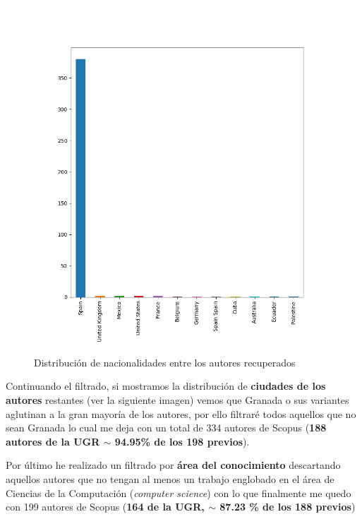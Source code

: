 \begin{figure}[h!]
	
	\centering
	\includegraphics[width=0.9\linewidth]{imagenes/country_hist}
	\caption{Distribución de nacionalidades entre los autores recuperados}
\end{figure}

Continuando el filtrado, si mostramos la distribución de \textbf{ciudades de los autores} restantes (ver la siguiente imagen) vemos que Granada o sus variantes aglutinan a la gran mayoría de los autores, por ello filtraré todos aquellos que no sean Granada lo cual me deja con un total de 334 autores de Scopus (\textbf{188 autores de la \acrshort{UGR} $\sim$ 94.95\% de los 198 previos}).

Por último he realizado un filtrado por \textbf{área del conocimiento} descartando aquellos autores que no tengan al menos un trabajo englobado en el área de Ciencias de la Computación (\textit{computer science}) con lo que finalmente me quedo con 199 autores de Scopus (\textbf{164 de la \acrshort{UGR}, $\sim$ 87.23 \% de los 188 previos})

